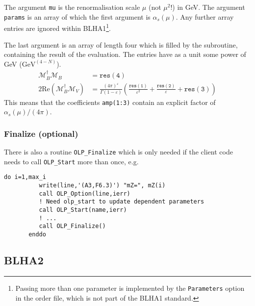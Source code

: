 The argument \texttt{mu} is the renormalisation scale $\mu$ (not $\mu^2$!)
in GeV. The argument {\tt params} is an array of which the first argument is
$\alpha_s(\mu)$. Any further array entries are ignored within BLHA1\footnote{
Passing more than one parameter is implemented by the \texttt{Parameters}
option in the order file, which is  not part of the BLHA1 standard.}.

The last argument is an array of length four which is filled by the subroutine, 
containing the result of the evaluation. The entries have as a unit some
power of GeV ($\mathrm{GeV}^{(4-N)}$).
\begin{align}
\label{eq:res}
\mathcal{M}_B^\dagger\mathcal{M}_B&=\mathtt{res(4)}\nonumber\\
2\mathrm{Re}\left(\mathcal{M}_B^\dagger\mathcal{M}_V\right)&=
\frac{(4\pi)^\varepsilon}{\Gamma(1-\varepsilon)}\left(
\frac{\mathtt{res(1)}}{\varepsilon^2}
+\frac{\mathtt{res(2)}}{\varepsilon}
+\mathtt{res(3)}
\right)
\end{align}
This means that the coefficients \texttt{amp(1:3)} contain
an explicit factor of $\alpha_s(\mu)/(4\pi)$.

\subsubsection{Finalize (optional)}
There is also a routine \texttt{OLP\_Finalize} which is only needed
if the client code needs to call \texttt{OLP\_Start} more than once, e.g.
\begin{lstlisting}[columns=fullflexibel]
       do i=1,max_i
          write(line,'(A3,F6.3)') "mZ=", mZ(i)
          call OLP_Option(line,ierr)
          ! Need olp_start to update dependent parameters
          call OLP_Start(name,ierr)
          ! ...
          call OLP_Finalize()
       enddo
\end{lstlisting}

\subsection{BLHA2}



